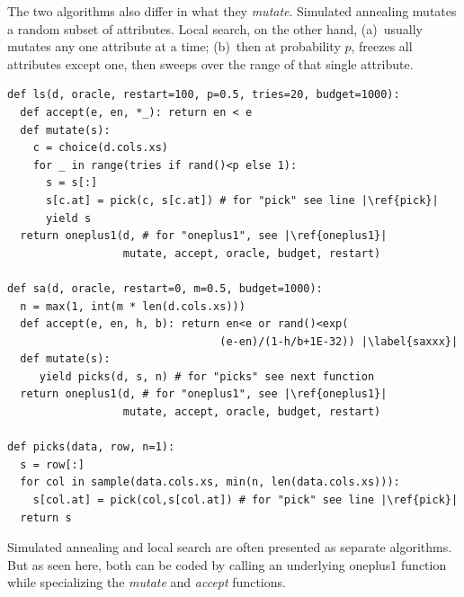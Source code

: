 \documentclass[AMA,STIX2COL]{WileyNJDv5}
\begin{document}
{The two algorithms also differ in what they {\em mutate}. Simulated
annealing mutates a random subset of attributes. Local search, on the other hand,
(a)~usually mutates any one attribute at a time; (b)~then at
probability $p$, freezes all attributes except one, then sweeps over the range
of that single attribute.

\begin{verbatim}
def ls(d, oracle, restart=100, p=0.5, tries=20, budget=1000): 
  def accept(e, en, *_): return en < e
  def mutate(s):
    c = choice(d.cols.xs)
    for _ in range(tries if rand()<p else 1):
      s = s[:]
      s[c.at] = pick(c, s[c.at]) # for "pick" see line |\ref{pick}|
      yield s
  return oneplus1(d, # for "oneplus1", see |\ref{oneplus1}|
                  mutate, accept, oracle, budget, restart)
 
def sa(d, oracle, restart=0, m=0.5, budget=1000): 
  n = max(1, int(m * len(d.cols.xs)))
  def accept(e, en, h, b): return en<e or rand()<exp(
                                 (e-en)/(1-h/b+1E-32)) |\label{saxxx}|
  def mutate(s): 
     yield picks(d, s, n) # for "picks" see next function
  return oneplus1(d, # for "oneplus1", see |\ref{oneplus1}|
                  mutate, accept, oracle, budget, restart)

def picks(data, row, n=1): 
  s = row[:]
  for col in sample(data.cols.xs, min(n, len(data.cols.xs))):
    s[col.at] = pick(col,s[col.at]) # for "pick" see line |\ref{pick}|
  return s
\end{verbatim}
Simulated annealing and local search are often presented as separate
algorithms. But as seen here, both can be coded by calling an
underlying \textsf{oneplus1} function while specializing the
{\em mutate} and {\em accept} functions.

}
\end{document}
